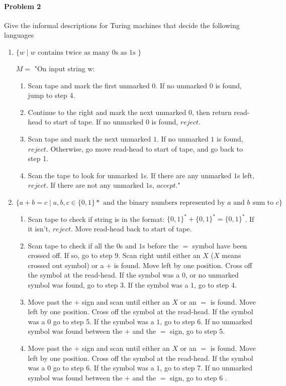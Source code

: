 \documentclass{article}
\begin{document}
\paragraph{Problem 2}
Give the informal descriptions for Turing machines that decide the following languages
\begin{enumerate}[\indent a)]
    \item $\{w \;|\; w \text{ contains twice as many 0s as 1s }\}$
    
	$M = $ "On input string w:
	\begin{enumerate}[\indent 1.]
		\item Scan tape and mark the first unmarked $0$. If no unmarked $0$ is found, jump to step 4.
		\item Continue to the right and mark the next unmarked $0$, then return read-head to start of tape. If no unmarked $0$ is found, $reject$.
		\item Scan tape and mark the next unmarked $1$. If no unmarked $1$ is found, $reject$. Otherwise, go move read-head to start of tape, and go back to step 1.
		\item Scan the tape to look for unmarked $1$s. If there are any unmarked $1$s left, $reject$. If there are not any unmarked $1$s, $accept$."	
    \end{enumerate}


    \item $\{a+b=c \;|\; a,b,c \in \{0,1\}* \text{ and the binary numbers represented by $a$ 
    and $b$ sum to $c$} \}$
    
    \begin{enumerate}[\indent 1.]
		\item Scan tape to check if string is in the format: $\{0,1\}^* + \{0,1\}^* = \{0,1\}^* $. If it isn't, $reject$. Move read-head back to start of tape.
		\item Scan tape to check if all the $0$s and $1$s  before the $=$ symbol have been crossed off. If so, go to step 9. Scan right until either an $X$ ($X$ means crossed out symbol) or a $+$ is found. Move left by one position. Cross off the symbol at the read-head. If the symbol was a $0$, or no unmarked symbol was found, go to step 3. If the symbol was a $1$, go to step 4.
		
		
		\item Move past the $+$ sign and scan until either an $X$ or an $=$ is found. Move left by one position. Cross off the symbol at the read-head. If the symbol was a $0$ go to step 5. If the symbol was a $1$, go to step 6. If no unmarked symbol was found between the $+$ and the $=$ sign, go to step 5.
		\item Move past the $+$ sign and scan until either an $X$ or an $=$ is found. Move left by one position. Cross off the symbol at the read-head. If the symbol was a $0$ go to step 6. If the symbol was a $1$, go to step 7. If no unmarked symbol was found between the $+$ and the $=$ sign, go to step 6 .
		

\end{enumerate}
\end{enumerate}
\end{document}

